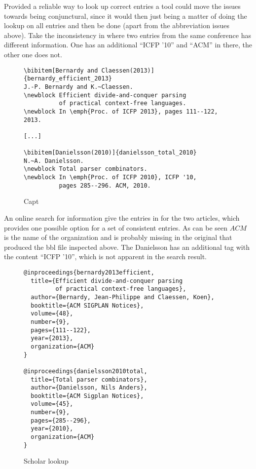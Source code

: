 
Provided a reliable way to look up correct entries a tool could move
the issues towards being conjunctural, since it would then just being a
matter of doing the lookup on all entries and then be done (apart from
the abbreviation issues above).  Take the inconsistency in
 where two entries from the
same conference has different information.  One has an additional
``ICFP '10'' and ``ACM'' in there, the other one does not.

\begin{figure}
  \centering
  \begin{small}
\begin{verbatim}
\bibitem[Bernardy and Claessen(2013)]{bernardy_efficient_2013}
J.-P. Bernardy and K.~Claessen.
\newblock Efficient divide-and-conquer parsing 
          of practical context-free languages.
\newblock In \emph{Proc. of ICFP 2013}, pages 111--122, 2013.

[...]

\bibitem[Danielsson(2010)]{danielsson_total_2010}
N.~A. Danielsson.
\newblock Total parser combinators.
\newblock In \emph{Proc. of ICFP 2010}, ICFP '10,
          pages 285--296. ACM, 2010.
\end{verbatim}
  \end{small}
  \caption{Capt}
\label{fig:inconsistent_proceedings}
\end{figure}

An online search for {\bibtex} information give the entries in
 for the two articles,
which provides one possible option for a set of consistent entries.
As can be seen $ACM$ is the name of the organization and is probably
missing in the original {\bibtex} that produced the bbl file inspected
above.  The Danielsson has an additional tag with the content ``ICFP
'10'', which is not apparent in the search result.

\begin{figure}
  \centering
\begin{verbatim}
@inproceedings{bernardy2013efficient,
  title={Efficient divide-and-conquer parsing
         of practical context-free languages},
  author={Bernardy, Jean-Philippe and Claessen, Koen},
  booktitle={ACM SIGPLAN Notices},
  volume={48},
  number={9},
  pages={111--122},
  year={2013},
  organization={ACM}
}

@inproceedings{danielsson2010total,
  title={Total parser combinators},
  author={Danielsson, Nils Anders},
  booktitle={ACM Sigplan Notices},
  volume={45},
  number={9},
  pages={285--296},
  year={2010},
  organization={ACM}
}
\end{verbatim}
  \caption{Scholar lookup}
\label{fig:missing_org_scholar_lookup}
\end{figure}

